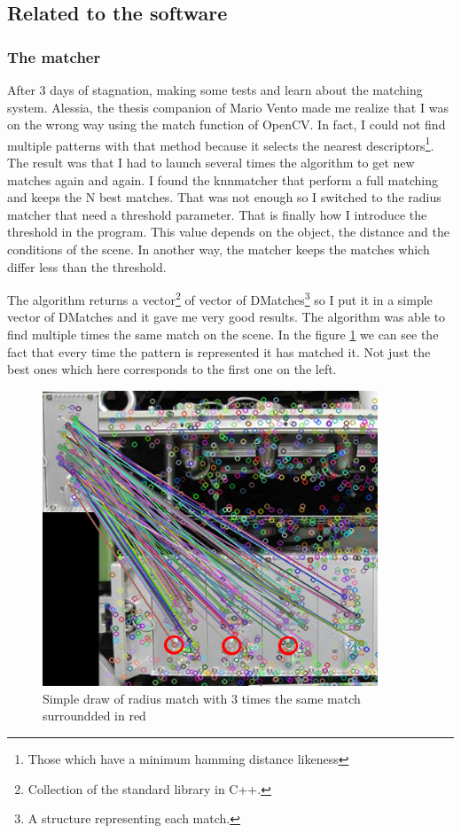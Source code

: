 	\subsection{Related to the software}
	
	\subsubsection{The matcher}
	
	\par After 3 days of stagnation, making some tests and learn about the matching system. Alessia, the thesis companion of Mario Vento made me realize that I was on the wrong way using the match function of OpenCV. In fact, I could not find multiple patterns with that method because it selects the nearest descriptors\footnote{Those which have a minimum hamming distance likeness}. The result was that I had to launch several times the algorithm to get new matches again and again. I found the knnmatcher that perform a full matching and keeps the N best matches. That was not enough so I switched to the radius matcher that need a threshold parameter. That is finally how I introduce the threshold in the program. This value depends on the object, the distance and the conditions of the scene. In another way, the matcher keeps the matches which differ less than the threshold.
	\par The algorithm returns a vector\footnote{Collection of the standard library in C++.} of vector of DMatches\footnote{A structure representing each match.} so I put it in a simple vector of DMatches and it gave me very good results. The algorithm was able to find multiple times the same match on the scene. In the figure \ref{matches} we can see the fact that every time the pattern is represented it has matched it. Not just the best ones which here corresponds to the first one on the left.
	
	
	\begin{figure}[h]
		\begin{center}
			\includegraphics[width=10cm]{images_not_compressed/matches.jpg}
			\caption{Simple draw of radius match with 3 times the same match surroundded in red}
			\label{matches}	
		\end{center}
	\end{figure}
	
